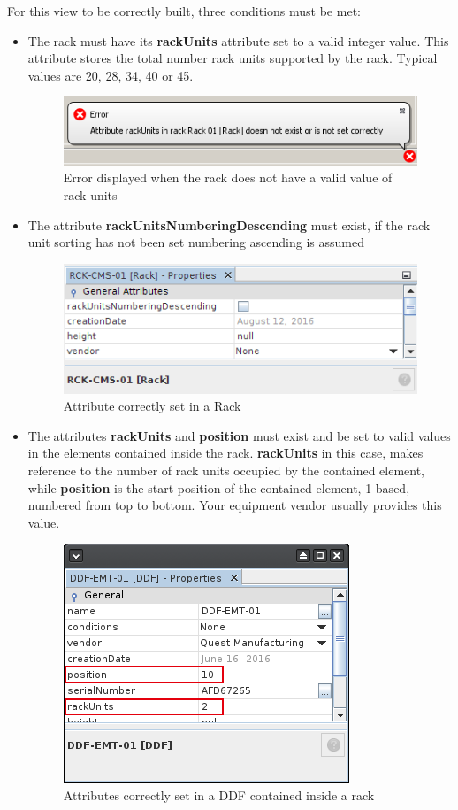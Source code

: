 \documentclass[a4paper]{article}
\begin{document}
		For this view to be correctly built, three conditions must be met:
		\begin{itemize}
			\item The rack must have its \textbf{rackUnits} attribute set to a valid integer value. This attribute stores the total number rack units supported by the rack. Typical values are 20, 28, 34, 40 or 45.
			\begin{figure}[h!]
				\centering
				\includegraphics[width=0.6\linewidth]{img/error_rack_view_not_rackunits.png}
				\caption{Error displayed when the rack does not have a valid value of rack units}
				\label{fig:error_rack_view_not_rackunits}
			\end{figure}
			\item The attribute \textbf{rackUnitsNumberingDescending} must exist, if the rack unit sorting has not been set numbering ascending is assumed
			\begin{figure}
				\centering
				\includegraphics[width=0.4\linewidth]{img/rack_units_numbering_descending_attribute.png}
				\caption{Attribute correctly set in a Rack}
				\label{fig:rack_units_numbering_descending_attribute}
			\end{figure}
			\item The attributes \textbf{rackUnits} and \textbf{position} must exist and be set to valid values in the elements contained inside the rack. \textbf{rackUnits} in this case, makes reference to the number of rack units occupied by the contained element, while \textbf{position} is the start position of the contained element, 1-based, numbered from top to bottom. Your equipment vendor usually provides this value.
			\begin{figure}[h!]
				\centering
				\includegraphics[width=0.4\linewidth]{img/rack_view_attributes_contained_element.png}
				\caption{Attributes correctly set in a DDF contained inside a rack}
				\label{fig:rack_view_attributes_contained_element}
			\end{figure}
		\end{itemize}
\end{document}
